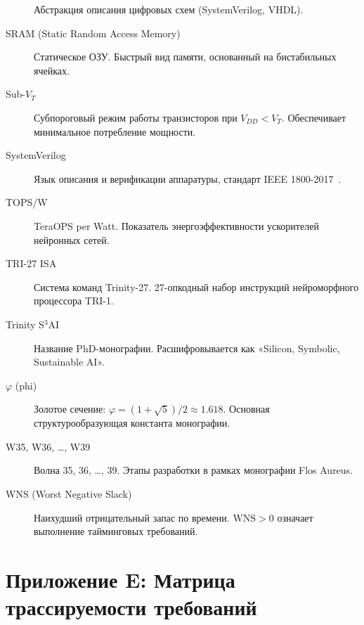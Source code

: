 \begin{description}
    Абстракция описания цифровых схем (SystemVerilog, VHDL).
  \item[SRAM (Static Random Access Memory)] Статическое ОЗУ.
    Быстрый вид памяти, основанный на бистабильных ячейках.
  \item[Sub-$V_T$] Субпороговый режим работы транзисторов
    при $V_{DD} < V_T$. Обеспечивает минимальное потребление мощности.
  \item[SystemVerilog] Язык описания и верификации аппаратуры,
    стандарт IEEE 1800-2017~\cite{IEEE-SV-1800-2017}.
  \item[TOPS/W] TeraOPS per Watt. Показатель энергоэффективности
    ускорителей нейронных сетей.
  \item[TRI-27 ISA] Система команд Trinity-27. 27-опкодный
    набор инструкций нейроморфного процессора TRI-1.
  \item[Trinity S$^3$AI] Название PhD-монографии. Расшифровывается
    как «Silicon, Symbolic, Sustainable AI».
  \item[$\varphi$ (phi)] Золотое сечение: $\varphi = (1+\sqrt{5})/2
    \approx 1.618$. Основная структурообразующая константа монографии.
  \item[W35, W36, \ldots, W39] Волна 35, 36, \ldots, 39.
    Этапы разработки в рамках монографии Flos Aureus.
  \item[WNS (Worst Negative Slack)] Наихудший отрицательный запас
    по времени. $\mathrm{WNS} > 0$ означает выполнение тайминговых
    требований.
\end{description}

\section*{Приложение E: Матрица трассируемости требований}
\label{sec:appendix-traceability}

